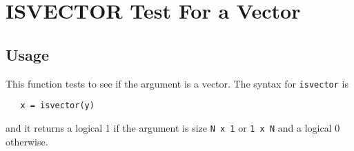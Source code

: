 \section{ISVECTOR Test For a Vector}

\subsection{Usage}

This function tests to see if the argument is a vector.  The 
syntax for \verb|isvector| is
\begin{verbatim}
   x = isvector(y)
\end{verbatim}
and it returns a logical 1 if the argument is size \verb|N x 1| or
\verb|1 x N| and a logical 0 otherwise.
